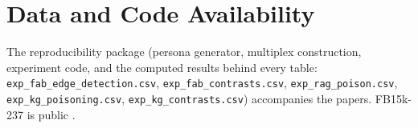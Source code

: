 \documentclass[conference]{IEEEtran}
\begin{document}
\section*{Data and Code Availability}
The reproducibility package (persona generator, multiplex construction,
experiment code, and the computed results behind every table:
\texttt{exp\_fab\_edge\_detection.csv}, \texttt{exp\_fab\_contrasts.csv},
\texttt{exp\_rag\_poison.csv}, \texttt{exp\_kg\_poisoning.csv},
\texttt{exp\_kg\_contrasts.csv}) accompanies the papers. FB15k-237 is
public \cite{toutanova2015fb15k}.



\end{document}
